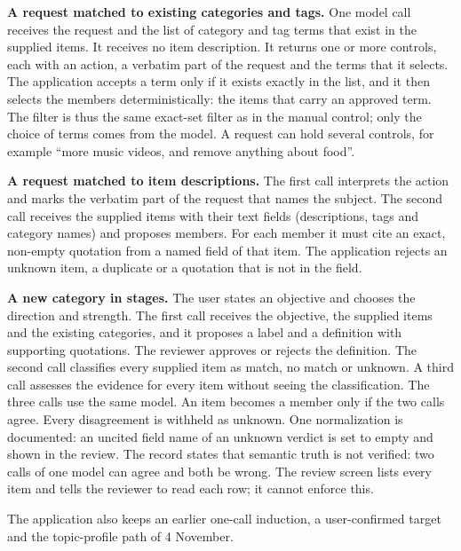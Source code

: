 \documentclass[conference]{IEEEtran}
\begin{document}
\textbf{A request matched to existing categories and tags.} One model call receives the request and the list of category and tag terms that exist in the supplied items. It receives no item description. It returns one or more controls, each with an action, a verbatim part of the request and the terms that it selects. The application accepts a term only if it exists exactly in the list, and it then selects the members deterministically: the items that carry an approved term. The filter is thus the same exact-set filter as in the manual control; only the choice of terms comes from the model. A request can hold several controls, for example ``more music videos, and remove anything about food''.

\textbf{A request matched to item descriptions.} The first call interprets the action and marks the verbatim part of the request that names the subject. The second call receives the supplied items with their text fields (descriptions, tags and category names) and proposes members. For each member it must cite an exact, non-empty quotation from a named field of that item. The application rejects an unknown item, a duplicate or a quotation that is not in the field.

\textbf{A new category in stages.} The user states an objective and chooses the direction and strength. The first call receives the objective, the supplied items and the existing categories, and it proposes a label and a definition with supporting quotations. The reviewer approves or rejects the definition. The second call classifies every supplied item as match, no match or unknown. A third call assesses the evidence for every item without seeing the classification. The three calls use the same model. An item becomes a member only if the two calls agree. Every disagreement is withheld as unknown. One normalization is documented: an uncited field name of an unknown verdict is set to empty and shown in the review. The record states that semantic truth is not verified: two calls of one model can agree and both be wrong. The review screen lists every item and tells the reviewer to read each row; it cannot enforce this.

The application also keeps an earlier one-call induction, a user-confirmed target and the topic-profile path of 4 November.
\end{document}
